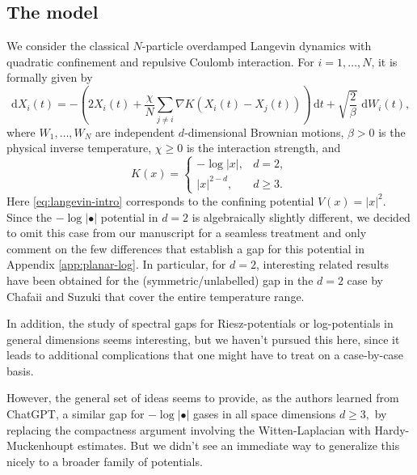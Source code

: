 \documentclass[12pt,reqno,letterpaper]{amsart}
\theoremstyle{definition}
\theoremstyle{remark}
\numberwithin{equation}{section}
\newcommand{\dd}{\,\mathrm d}
\begin{document}
\subsection{The model} 
We consider the classical \(N\)-particle overdamped Langevin dynamics with
quadratic confinement and repulsive Coulomb interaction. For
\(i=1,\dots,N\), it is formally given by
\begin{equation}\label{eq:langevin-intro}
 \dd X_i(t)
 =
 -\left(
 2X_i(t)
 +\frac{\chi}{N}\sum_{j\ne i}
   \nabla K(X_i(t)-X_j(t))
 \right)\dd t
 +\sqrt{\frac{2}{\beta}}\,\dd W_i(t),
\end{equation}
where \(W_1,\dots,W_N\) are independent \(d\)-dimensional Brownian
motions, \(\beta>0\) is the physical inverse temperature,
\(\chi\ge0\) is the interaction strength, and
\[
 K(x)=
 \begin{cases}
  -\log|x|, & d=2,\\
  |x|^{2-d}, & d\ge3.
 \end{cases}
\]
Here \eqref{eq:langevin-intro} corresponds to the confining potential
\(V(x)=|x|^2\). Since the $-\log\vert \bullet \vert$ potential in $d=2$ is algebraically slightly different, we decided to omit this case from our manuscript for a seamless treatment and only comment on the few differences that establish a gap for this potential in Appendix \ref{app:planar-log}. In particular, for $d=2$, interesting related results have been obtained for the (symmetric/unlabelled) gap in the $d=2$ case by Chafaii \cite{Chafai2026} and Suzuki \cite{Suzuki2026} that cover the entire temperature range. 

In addition, the study of spectral gaps for Riesz-potentials or log-potentials in general dimensions seems interesting, but we haven't pursued this here, since it leads to additional complications that one might have to treat on a case-by-case basis. 

However, the general set of ideas seems to provide, as the authors learned from ChatGPT, a similar gap for $-\log|\bullet|$ gases in all space dimensions $d\ge 3,$ by replacing the compactness argument involving the Witten-Laplacian with Hardy-Muckenhoupt estimates. But we didn't see an immediate way to generalize this nicely to a broader family of potentials. 
\end{document}
